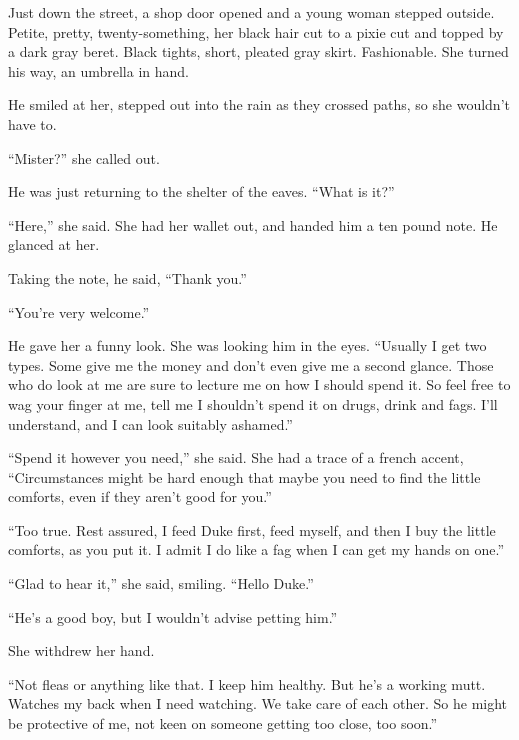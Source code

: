 Just down the street, a shop door opened and a young woman stepped outside.  Petite, pretty, twenty-something, her black hair cut to a pixie cut and topped by a dark gray beret.  Black tights, short, pleated gray skirt.  Fashionable.  She turned his way, an umbrella in hand.



He smiled at her, stepped out into the rain as they crossed paths, so she wouldn't have to.



``Mister?'' she called out.



He was just returning to the shelter of the eaves.  ``What is it?''



``Here,'' she said.  She had her wallet out, and handed him a ten pound note.  He glanced at her.



Taking the note, he said, ``Thank you.''



``You're very welcome.''



He gave her a funny look.  She was looking him in the eyes.  ``Usually I get two types.  Some give me the money and don't even give me a second glance.  Those who do look at me are sure to lecture me on how I should spend it.  So feel free to wag your finger at me, tell me I shouldn't spend it on drugs, drink and fags.  I'll understand, and I can look suitably ashamed.''



``Spend it however you need,'' she said.  She had a trace of a french accent, ``Circumstances might be hard enough that maybe you need to find the little comforts, even if they aren't good for you.''



``Too true.  Rest assured, I feed Duke first, feed myself, and then I buy the little comforts, as you put it.  I admit I do like a fag when I can get my hands on one.''



``Glad to hear it,'' she said, smiling.  ``Hello Duke.''



``He's a good boy, but I wouldn't advise petting him.''



She withdrew her hand.



``Not fleas or anything like that.  I keep him healthy.  But he's a working mutt.  Watches my back when I need watching.  We take care of each other.  So he might be protective of me, not keen on someone getting too close, too soon.''



